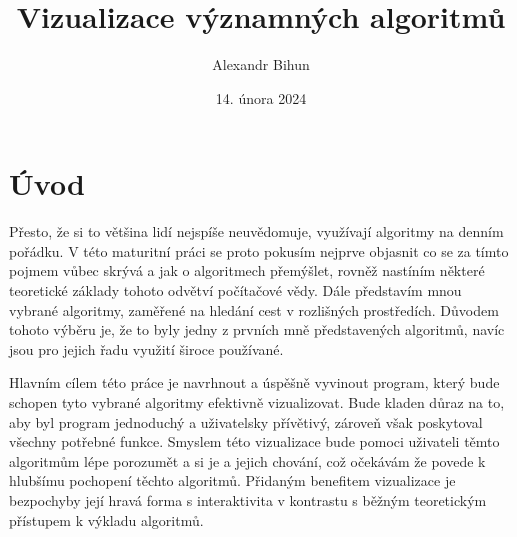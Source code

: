 \documentclass[12pt]{report}			%
\author{Alexandr Bihun}
\title{Vizualizace významných algoritmů}
\date{14. února 2024}
\begin{document}
	\mytitlepage						%
	
	
	
	
   {\tableofcontents\newpage}			%
	
	\chapter*{Úvod}
	Přesto, že si to většina lidí nejspíše neuvědomuje, využívají algoritmy na denním pořádku. 
	V této maturitní práci se proto pokusím nejprve objasnit co se za tímto pojmem vůbec skrývá a jak o algoritmech přemýšlet, rovněž nastíním některé teoretické základy tohoto odvětví počítačové vědy.
	Dále představím mnou vybrané algoritmy, zaměřené na hledání cest v rozlišných prostředích. Důvodem tohoto výběru je, že to byly jedny z prvních mně představených algoritmů, navíc jsou pro jejich řadu využití široce používané.
	 
	 	
Hlavním cílem této práce je navrhnout a úspěšně vyvinout program, který bude schopen tyto vybrané algoritmy efektivně vizualizovat. Bude kladen důraz na to, aby byl program jednoduchý a uživatelsky přívětivý, zároveň však poskytoval všechny potřebné funkce. Smyslem této vizualizace bude pomoci uživateli těmto algoritmům lépe porozumět a  si je a jejich chování, což očekávám že povede k hlubšímu pochopení těchto algoritmů. Přidaným benefitem vizualizace je bezpochyby její hravá forma s interaktivita
v kontrastu s běžným teoretickým přístupem k výkladu algoritmů.
\end{document}
